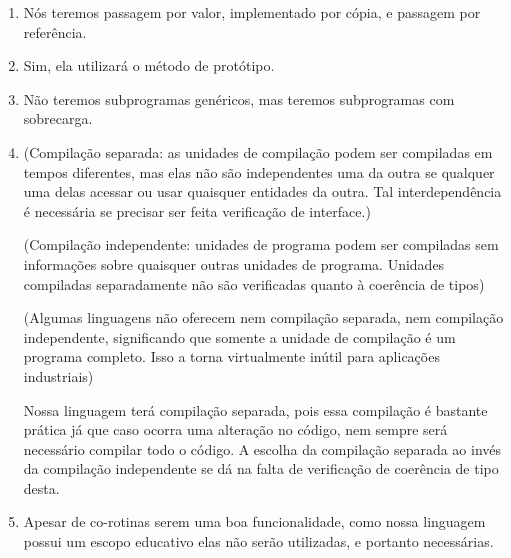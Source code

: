 \documentclass[12pt, a4paper]{article}
\begin{document}
\begin{enumerate}
        \item
        Nós teremos passagem por valor, implementado por cópia, e passagem por referência.

        \item
        Sim, ela utilizará o método de protótipo.

        \item
        Não teremos subprogramas genéricos, mas teremos subprogramas com sobrecarga.

        \begin{comment}
            Com sobrecarga:
            int soma(int a, int b) {
                return a+b;
            }

            float soma(float a, float b) {
                return a+b;
            }

            int soma(String a, String b) {
                return a^b;
            }

            Final das contas, posso lembrar o nome de apenas uma função e fazer:

            soma(1, 2);
            soma(1.5, 2.5);
            soma(“teste”, “ ftw”);

            Sem sobrecarga:

            int somaInt(int a, int b) {
                return a+b;
            }

            float somaFloat(float a, float b) {
                return a+b;
            }

            int somaString(String a, String b) {
                return a^b;
            }
        \end{comment}

        \item
        (Compilação separada: as unidades de compilação podem ser compiladas em tempos diferentes, mas elas não são independentes uma da outra se qualquer uma delas acessar ou usar quaisquer entidades da outra. Tal interdependência é necessária se precisar ser feita verificação de interface.)
        
        (Compilação independente: unidades de programa podem ser compiladas sem informações sobre quaisquer outras unidades de programa. Unidades compiladas separadamente não são verificadas quanto à coerência de tipos)
        
        (Algumas linguagens não oferecem nem compilação separada, nem compilação independente, significando que somente a unidade de compilação é um programa completo. Isso a torna virtualmente inútil para aplicações industriais)
        
        Nossa linguagem terá compilação separada, pois essa compilação é bastante prática já que caso ocorra uma alteração no código, nem sempre será necessário compilar todo o código. A escolha da compilação separada ao invés da compilação independente se dá na falta de verificação de coerência de tipo desta.
        
        \item
		Apesar de co-rotinas serem uma boa funcionalidade, como nossa linguagem possui um escopo educativo elas não serão utilizadas, e portanto necessárias.
        
    \end{enumerate}
\end{document}
